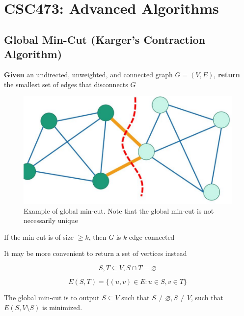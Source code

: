 \documentclass[../notes.tex]{subfiles}
\begin{document}
\section{CSC473: Advanced Algorithms}

\subsection{Global Min-Cut (Karger's Contraction Algorithm)}


\textbf{Given} an undirected, unweighted, and connected graph $ G = (V, E) $, \textbf{return} the smallest set of edges that disconnects $ G $



\begin{figure}[H]
  \centering
  \includegraphics[width=0.8\linewidth]{img/image_2023-01-09-12-40-24.png}
  \caption{Example of global min-cut. Note that the global min-cut is not necessarily unique}
\end{figure}



\begin{lemma}
  If the min cut is of size $ \ge k $, then $ G $ is $ k $-edge-connected
\end{lemma}

It may be more convenient to return a set of vertices instead

\begin{definition}
  
\begin{equation}
  S, T \subseteq V, S \cap T = \varnothing 
\end{equation}

\begin{equation}
  E(S,T) = \{(u,v) \in E : u \in S, v \in T\} 
\end{equation}

The global min-cut is to output $ S \subseteq V $ such that $ S \neq \varnothing, S \neq V $,  such that $ E(S, V\setminus S ) $ is minimized.


\end{definition}
\end{document}
